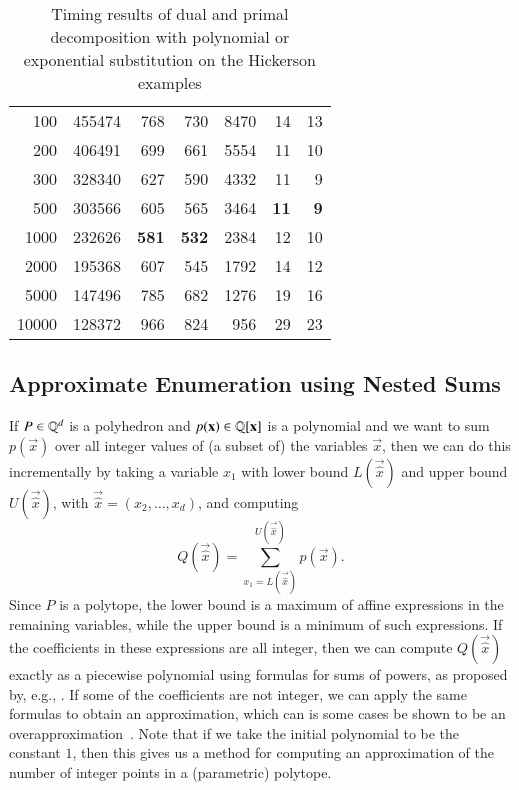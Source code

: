 \begin{table}
\begin{center}
\begin{tabular}{rrrrrrr}
\\
100 & 455474 & 768 & 730 & 8470 & 14 & 13
\\
200 & 406491 & 699 & 661 & 5554 & 11 & 10
\\
300 & 328340 & 627 & 590 & 4332 & 11 & 9
\\
500 & 303566 & 605 & 565 & 3464 & {\bf 11} & {\bf 9}
\\
1000 & 232626 & {\bf 581} & {\bf 532} & 2384 & 12 & 10
\\
2000 & 195368 & 607 & 545 & 1792 & 14 & 12
\\
5000 & 147496 & 785 & 682 & 1276 & 19 & 16
\\
10000 & 128372 & 966 & 824 & 956 & 29 & 23
\\
\hline
\end{tabular}
\caption{Timing results of dual and primal decomposition with
polynomial or exponential substitution on the Hickerson examples}
\label{t:hickerson}
\end{center}
\end{table}

\subsection{Approximate Enumeration using Nested Sums}
\label{s:nested}

If $P \in \mathbb{Q}^d$ is a polyhedron and $p(\vec x) \in \QQ[\vec x]$ is a
polynomial and we want to sum $p(\vec x)$ over all integer values
of (a subset of) the variables $\vec x$, then we can do this incrementally
by taking a variable $x_1$ with lower bound $L(\vec{\hat x})$
and upper bound $U(\vec{\hat x})$, with $\vec{\hat x} = (x_2, \ldots, x_d)$,
and computing
\begin{equation}
\label{eq:nested:sum}
Q(\vec{\hat x}) = \sum_{x_1 = L(\vec{\hat x})}^{U(\vec{\hat x})} p(\vec x)
.
\end{equation}
Since $P$ is a polytope, the lower bound is a maximum of affine expressions
in the remaining variables, while the upper bound is a minimum of such expressions.
If the coefficients in these expressions are all integer, then we can
compute $Q(\vec{\hat x})$ exactly as a piecewise polynomial using formulas
for sums of powers, as proposed by, e.g.,
.
If some of the coefficients are not integer, we can apply the same formulas
to obtain an approximation, which can is some cases be shown
to be an overapproximation~.
Note that if we take the initial polynomial to be the constant $1$, then
this gives us a method for computing an approximation of the number
of integer points in a (parametric) polytope.


